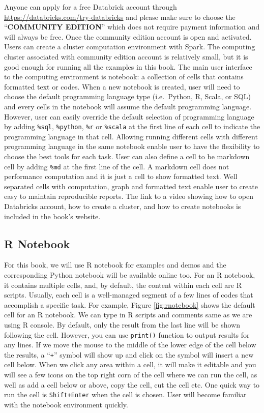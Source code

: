 \documentclass[
  12pt,
]{krantz}
\begin{document}
Anyone can apply for a free Databrick account through \url{https://databricks.com/try-databricks} and please make sure to choose the ``\textbf{COMMUNITY EDITION}'' which does not require payment information and will always be free. Once the community edition account is open and activated. Users can create a cluster computation environment with Spark. The computing cluster associated with community edition account is relatively small, but it is good enough for running all the examples in this book. The main user interface to the computing environment is notebook: a collection of cells that contains formatted text or codes. When a new notebook is created, user will need to choose the default programming language type (i.e.~Python, R, Scala, or SQL) and every cells in the notebook will assume the default programming language. However, user can easily override the default selection of programming language by adding \texttt{\%sql}, \texttt{\%python}, \texttt{\%r} or \texttt{\%scala} at the first line of each cell to indicate the programming language in that cell. Allowing running different cells with different programming language in the same notebook enable user to have the flexibility to choose the best tools for each task. User can also define a cell to be markdown cell by adding \texttt{\%md} at the first line of the cell. A markdown cell does not performance computation and it is just a cell to show formatted text. Well separated cells with computation, graph and formatted text enable user to create easy to maintain reproducible reports. The link to a video showing how to open Databricks account, how to create a cluster, and how to create notebooks is included in the book's website.

\hypertarget{r-notebook}{%
\subsection{R Notebook}\label{r-notebook}}

For this book, we will use R notebook for examples and demos and the corresponding Python notebook will be available online too. For an R notebook, it contains multiple cells, and, by default, the content within each cell are R scripts. Usually, each cell is a well-managed segment of a few lines of codes that accomplish a specific task. For example, Figure \ref{fig:rnotebook} shows the default cell for an R notebook. We can type in R scripts and comments same as we are using R console. By default, only the result from the last line will be shown following the cell. However, you can use \texttt{print()} function to output results for any lines. If we move the mouse to the middle of the lower edge of the cell below the results, a ``\texttt{+}'' symbol will show up and click on the symbol will insert a new cell below. When we click any area within a cell, it will make it editable and you will see a few icons on the top right corn of the cell where we can run the cell, as well as add a cell below or above, copy the cell, cut the cell etc. One quick way to run the cell is \texttt{Shift+Enter} when the cell is chosen. User will become familiar with the notebook environment quickly.
\end{document}
